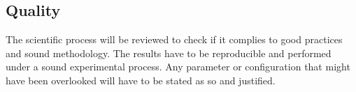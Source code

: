 
\subsection{Quality}

The scientific process will be reviewed to check if it complies to good practices and sound methodology. The results have to be reproducible and performed under a sound experimental process. Any parameter or configuration that might have been overlooked will have to be stated as so and justified.
